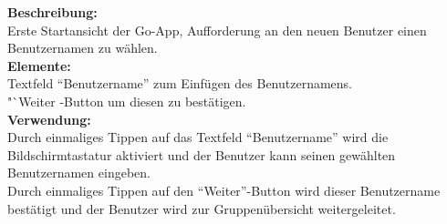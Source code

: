 \textbf{Beschreibung:}\\
Erste Startansicht der Go-App, Aufforderung an den neuen Benutzer einen Benutzernamen zu wählen.\\
\textbf{Elemente:}\\
Textfeld "`Benutzername"' zum Einfügen des Benutzernamens.\\
"`Weiter\grqq
-Button um diesen zu bestätigen.\\
\textbf{Verwendung:}\\
Durch einmaliges Tippen auf das Textfeld "`Benutzername"' wird die Bildschirmtastatur aktiviert und der Benutzer kann seinen gewählten Benutzernamen eingeben.\\
Durch einmaliges Tippen auf den "`Weiter"'-Button wird dieser Benutzername bestätigt und der Benutzer wird zur Gruppenübersicht weitergeleitet.

\clearpage
\newpage

